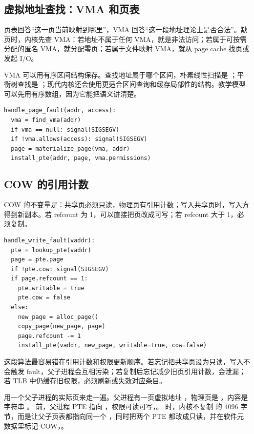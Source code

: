 \subsection{虚拟地址查找：VMA 和页表}

页表回答“这一页当前映射到哪里”，VMA 回答“这一段地址理论上是否合法”。缺页时，内核先查 VMA：若地址不属于任何 VMA，就是非法访问；若属于可按需分配的匿名 VMA，就分配零页；若属于文件映射 VMA，就从 page cache 找页或发起 I/O。

VMA 可以用有序区间结构保存。查找地址属于哪个区间，朴素线性扫描是 ；平衡树查找是 ；现代内核还会使用更适合区间查询和缓存局部性的结构。教学模型可以先用有序数组，因为它能把语义讲清楚。

\begin{lstlisting}
handle_page_fault(addr, access):
  vma = find_vma(addr)
  if vma == null: signal(SIGSEGV)
  if !vma.allows(access): signal(SIGSEGV)
  page = materialize_page(vma, addr)
  install_pte(addr, page, vma.permissions)
\end{lstlisting}

\subsection{COW 的引用计数}

COW 的不变量是：共享页必须只读，物理页有引用计数；写入共享页时，写入方得到新副本。若 refcount 为 1，可以直接把页改成可写；若 refcount 大于 1，必须复制。

\begin{lstlisting}
handle_write_fault(vaddr):
  pte = lookup_pte(vaddr)
  page = pte.page
  if !pte.cow: signal(SIGSEGV)
  if page.refcount == 1:
    pte.writable = true
    pte.cow = false
  else:
    new_page = alloc_page()
    copy_page(new_page, page)
    page.refcount -= 1
    install_pte(vaddr, new_page, writable=true, cow=false)
\end{lstlisting}

这段算法最容易错在引用计数和权限更新顺序。若忘记把共享页设为只读，写入不会触发 fault，父子进程会互相污染；若复制后忘记减少旧页引用计数，会泄漏；若 TLB 中仍缓存旧权限，必须刷新或失效对应条目。

用一个父子进程的实际页来走一遍。父进程有一页虚拟地址 ，物理页是 ，内容是字符串 。 前，父进程 PTE 指向 ，权限可读可写，。 时，内核不复制  的 4096 字节，而是让父子页表都指向同一个 ，同时把两个 PTE 都改成只读，并在软件元数据里标记 COW，。

